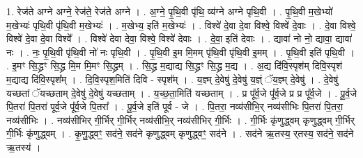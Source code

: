 \documentclass[17pt]{extarticle}
\begin{document}
1. रेज॑ते अग्ने अग्ने॒ रेज॑ते॒ रेज॑ते अग्ने । . अ॒ग्ने॒ पृ॒थि॒वी पृ॑थि॒ व्य॑ग्ने अग्ने पृथि॒वी । . पृ॒थि॒वी म॒खेभ्यो॑ म॒खेभ्यः॑ पृथि॒वी पृ॑थि॒वी म॒खेभ्यः॑ । . म॒खेभ्य॒ इति॑ म॒खेभ्यः॑ । . विश्वे॑ दे॒वा दे॒वा विश्वे॒ विश्वे॑ दे॒वाः । . दे॒वा विश्वे॒ विश्वे॑ दे॒वा दे॒वा विश्वे᳚ । . विश्वे॑ देवा देवा॒ विश्वे॒ विश्वे॑ देवाः । . दे॒वा॒ इति॑ देवाः । . द्यावा॑ नो नो॒ द्यावा॒ द्यावा॑ नः । . नः॒ पृ॒थि॒वी पृ॑थि॒वी नो॑ नः पृथि॒वी । . पृ॒थि॒वी इ॒म मि॒मम् पृ॑थि॒वी पृ॑थि॒वी इ॒मम् । . पृ॒थि॒वी इति॑ पृथि॒वी । . इ॒मꣳ सि॒द्ध्रꣳ सि॒द्ध्र मि॒म मि॒मꣳ सि॒द्ध्रम् । . सि॒द्ध्र म॒द्याद्य सि॒द्ध्रꣳ सि॒द्ध्र म॒द्य । . अ॒द्य दि॑वि॒स्पृश॑म् दिवि॒स्पृश॑ म॒द्याद्य दि॑वि॒स्पृश᳚म् । . दि॒वि॒स्पृश॒मिति॑ दिवि - स्पृश᳚म् । . य॒ज्ञ्म् दे॒वेषु॑ दे॒वेषु॑ य॒ज्ञ्ं ॅय॒ज्ञ्म् दे॒वेषु॑ । . दे॒वेषु॑ यच्छतां ॅयच्छताम् दे॒वेषु॑ दे॒वेषु॑ यच्छताम् । . य॒च्छ॒ता॒मिति॑ यच्छताम् । . प्र पू᳚र्व॒जे पू᳚र्व॒जे प्र प्र पू᳚र्व॒जे । . पू॒र्व॒जे पि॒तरा॑ पि॒तरा॑ पूर्व॒जे पू᳚र्व॒जे पि॒तरा᳚ । . पू॒र्व॒जे इति॑ पूर्व - जे । . पि॒तरा॒ नव्य॑सीभि॒र् नव्य॑सीभिः पि॒तरा॑ पि॒तरा॒ नव्य॑सीभिः । . नव्य॑सीभिर् गी॒र्भिर् गी॒र्भिर् नव्य॑सीभि॒र् नव्य॑सीभिर् गी॒र्भिः । . गी॒र्भिः कृ॑णुद्ध्वम् कृणुद्ध्वम् गी॒र्भिर् गी॒र्भिः कृ॑णुद्ध्वम् । . कृ॒णु॒द्ध्वꣳ॒॒ सद॑ने॒ सद॑ने कृणुद्ध्वम् कृणुद्ध्वꣳ॒॒ सद॑ने । . सद॑ने ऋ॒तस्य॒ र्‌तस्य॒ सद॑ने॒ सद॑ने ऋ॒तस्य॑ । \newline
\end{document}
